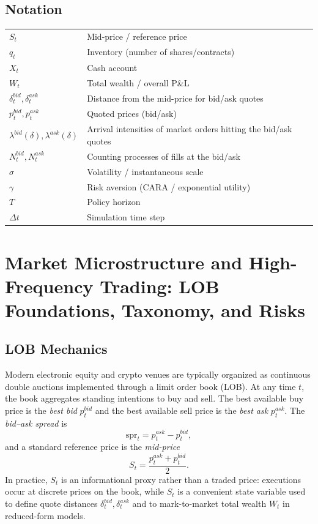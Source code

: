 \documentclass[a4paper,10pt,titlepage,oneside,openany]{book}
\theoremstyle{plain}\newtheorem{theorem}{Theorem}[chapter]
\theoremstyle{definition}\newtheorem{definition}{Definition}[chapter]
\theoremstyle{remark}\newtheorem{remark}{Remark}[chapter]
\begin{document}
\section*{Notation}
\begin{tabularx}{\textwidth}{@{}lX@{}}
\toprule
$S_t$ & Mid-price / reference price \\
$q_t$ & Inventory (number of shares/contracts) \\
$X_t$ & Cash account \\
$W_t$ & Total wealth / overall P\&L \\
$\delta_t^{bid}, \delta_t^{ask}$ & Distance from the mid-price for bid/ask quotes \\
$p_t^{bid}, p_t^{ask}$ & Quoted prices (bid/ask) \\
$\lambda^{bid}(\delta), \lambda^{ask}(\delta)$ & Arrival intensities of market orders hitting the bid/ask quotes \\
$N_t^{bid}, N_t^{ask}$ & Counting processes of fills at the bid/ask \\
$\sigma$ & Volatility / instantaneous scale \\
$\gamma$ & Risk aversion (CARA / exponential utility) \\
$T$ & Policy horizon \\
$\Delta t$ & Simulation time step \\
\bottomrule
\end{tabularx}

\chapter{Market Microstructure and High-Frequency Trading: LOB Foundations, Taxonomy, and Risks}
\label{ch:microstructure_hft}

\section{LOB Mechanics}
Modern electronic equity and crypto venues are typically organized as continuous double auctions implemented through a limit order book (LOB). At any time $t$, the book aggregates standing intentions to buy and sell. The best available buy price is the \emph{best bid} $p_t^{bid}$ and the best available sell price is the \emph{best ask} $p_t^{ask}$. The \emph{bid--ask spread} is
\[
\mathrm{spr}_t = p_t^{ask}-p_t^{bid},
\]
and a standard reference price is the \emph{mid-price}
\[
S_t=\frac{p_t^{ask}+p_t^{bid}}{2}.
\]
In practice, $S_t$ is an informational proxy rather than a traded price: executions occur at discrete prices on the book, while $S_t$ is a convenient state variable used to define quote distances $\delta_t^{bid},\delta_t^{ask}$ and to mark-to-market total wealth $W_t$ in reduced-form models.
\end{document}
